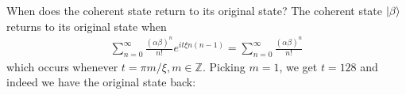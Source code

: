\documentclass{article}
\theoremstyle{definition}
\newcommand{\al}{\alpha}
\newcommand{\be}{\beta}
\newcommand{\f}[2]{\frac{#1}{#2}}
\begin{document}
\begin{enumerate}[label=\alph*)]
	
	When does the coherent state return to its original state? The coherent state $\ket{\be}$ returns to its original state when 
	\begin{align*}
		\sum_{n=0}^\infty \f{(\al\be)^n}{n!} e^{it\xi n(n-1)} = \sum_{n=0}^\infty \f{(\al\be)^n}{n!}
	\end{align*}
	which occurs whenever $t = \pi m/\xi, m\in \mathbb{Z}$. Picking $m=1$, we get $t = 128$ and indeed we have the original state back:
\end{enumerate}
\end{document}
